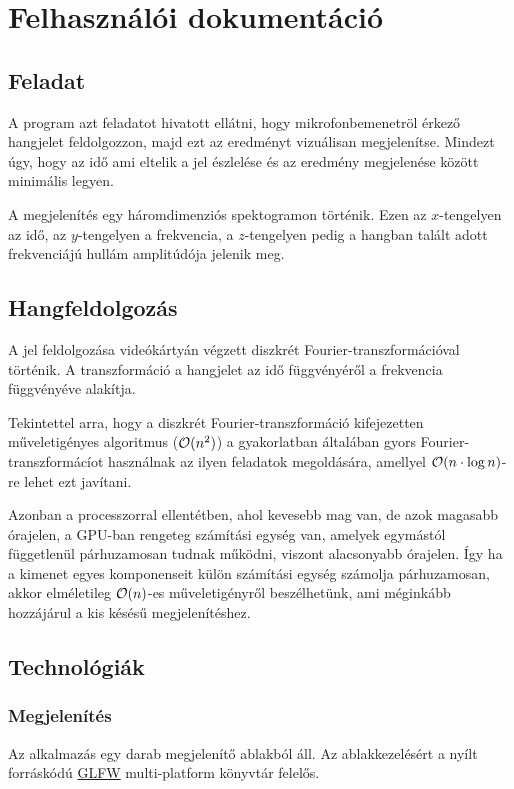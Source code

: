 
\section{Felhaszn\'al\'oi dokument\'aci\'o}
\subsection{Feladat}
A program azt feladatot hivatott ell\'atni, hogy mikrofonbemenetr\"ol \'erkez\H o hangjelet feldolgozzon, majd ezt az eredm\'enyt vizu\'alisan megjelen\'itse. Mindezt \'ugy, hogy az id\H o ami eltelik a jel \'eszlel\'ese \'es az eredm\'eny megjelen\'ese k\"oz\"ott minim\'alis legyen.

A megjelen\'it\'es egy h\'aromdimenzi\'os spektogramon t\"ort\'enik. Ezen az $x$-tengelyen az id\H o, az $y$-tengelyen a frekvencia, a $z$-tengelyen pedig a hangban tal\'alt adott frekvenci\'aj\'u hull\'am amplit\'ud\'oja jelenik meg.

\subsection{Hangfeldolgoz\'as}
A jel feldolgoz\'asa vide\'ok\'arty\'an v\'egzett diszkr\'et Fourier-transzform\'aci\'oval t\"ort\'enik. A transzform\'aci\'o a hangjelet az id\H o f\"uggv\'eny\'er\H ol a frekvencia f\"uggv\'eny\'eve alak\'itja. 

Tekintettel arra, hogy a diszkr\'et Fourier-transzform\'aci\'o kifejezetten m\H uveletig\'enyes algoritmus ($\mathcal{O}(n^2)$) a gyakorlatban \'altal\'aban gyors Fourier-transzform\'ac\'iot haszn\'alnak az ilyen feladatok megold\'as\'ara, amellyel $\mathcal{O}(n\cdot\log n)$-re lehet ezt jav\'itani.

Azonban a processzorral ellent\'etben, ahol kevesebb mag van, de azok magasabb \'orajelen, a GPU-ban rengeteg sz\'am\'it\'asi egys\'eg van, amelyek egym\'ast\'ol f\"uggetlen\"ul p\'arhuzamosan tudnak m\H uk\"odni, viszont alacsonyabb \'orajelen. \'Igy ha a kimenet egyes  komponenseit k\"ul\"on sz\'am\'it\'asi egys\'eg sz\'amolja p\'arhuzamosan, akkor elm\'eletileg $\mathcal{O}(n)$-es m\H uveletig\'enyr\H ol besz\'elhet\"unk, ami m\'egink\'abb hozz\'aj\'arul a kis k\'es\'es\H u megjelen\'it\'eshez. 


\subsection{Technol\'ogi\'ak}
\subsubsection{Megjelen\'it\'es}
Az alkalmaz\'as egy darab megjelen\'it\H o ablakb\'ol \'all. Az ablakkezel\'es\'ert a ny\'ilt forr\'ask\'od\'u \href{http://www.glfw.org/}{GLFW} multi-platform k\"onyvt\'ar felel\H os.


